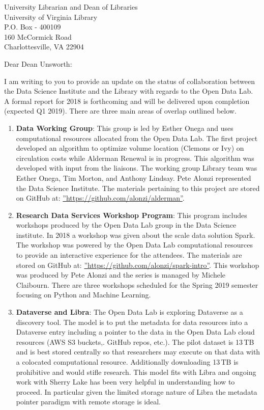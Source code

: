 \documentclass{letter}
\begin{document}
\begin{letter}{University Librarian and Dean of Libraries \\ University of Virginia Library \\ P.O. Box - 400109 \\ 160 McCormick Road \\ Charlottesville, VA 22904}

\opening{Dear Dean Unsworth:}

I am writing to you to provide an update on the status of collaboration between the Data Science Institute and the Library with regards to the Open Data Lab. A formal report for 2018 is forthcoming and will be delivered upon completion (expected Q1 2019). There are three main areas of overlap outlined below.

\begin{enumerate}
\item \textbf{Data Working Group}: This group is led by Esther Onega and uses computational resources allocated from the Open Data Lab. The first project developed an algorithm to optimize volume location (Clemons or Ivy) on circulation costs while Alderman Renewal is in progress. This algorithm was developed with input from the liaisons. The working group Library team was Esther Onega, Tim Morton, and Anthony Lindsay. Pete Alonzi represented the Data Science Institute. The materials pertaining to this project are stored on GitHub at: \hyperref[https://github.com/alonzi/alderman]{''https://github.com/alonzi/alderman''}.

\item \textbf{Research Data Services Workshop Program}: This program includes workshops produced by the Open Data Lab group in the Data Science institute. In 2018 a workshop was given about the scale data solution Spark. The workshop was powered by the Open Data Lab computational resources to provide an interactive experience for the attendees. The materials are stored on GitHub at:  \hyperref[https://github.com/alonzi/spark-intro]{''https://github.com/alonzi/spark-intro''}. This workshop was produced by Pete Alonzi and the series is managed by Michele Claibourn. There are three workshops scheduled for the Spring 2019 semester focusing on Python and Machine Learning.

\item \textbf{Dataverse and Libra}:
The Open Data Lab is exploring Dataverse as a discovery tool. The model is to put the metadata for data resources into a Dataverse entry including a pointer to the data in the Open Data Lab cloud resources (AWS S3 buckets,. GitHub repos, etc.). The pilot dataset is 13\,TB and is best stored centrally so that researchers may execute on that data with a colocated computational resource. Additionally downloading 13\,TB is prohibitive and would stifle research. This model fits with Libra and ongoing work with Sherry Lake has been very helpful in understanding how to proceed. In particular given the limited storage nature of Libra the metadata pointer paradigm with remote storage is ideal.
\end{enumerate}


\end{letter}
\end{document}
